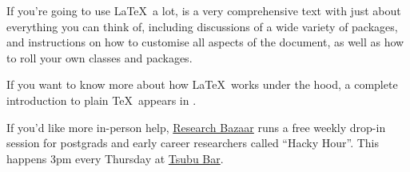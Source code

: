 If you're going to use \LaTeX\ a lot, \citet{mittelbach-goossens-2004}
is a very comprehensive text with just about everything you can think of,
including discussions of a wide variety of packages,
and instructions on how to customise all aspects of the document,
as well as how to roll your own classes and packages.

If you want to know more about how \LaTeX\ works under the hood,
a complete introduction to plain \TeX\ appears in \citet{knuth-texbook-1986}.

If you'd like more in-person help,
\href{http://melbourne.resbaz.edu.au/}{Research Bazaar}
runs a free weekly drop-in session for postgrads and early career researchers
called ``Hacky Hour''.
This happens 3pm every Thursday at \href{http://tsububar.com.au/}{Tsubu Bar}.

